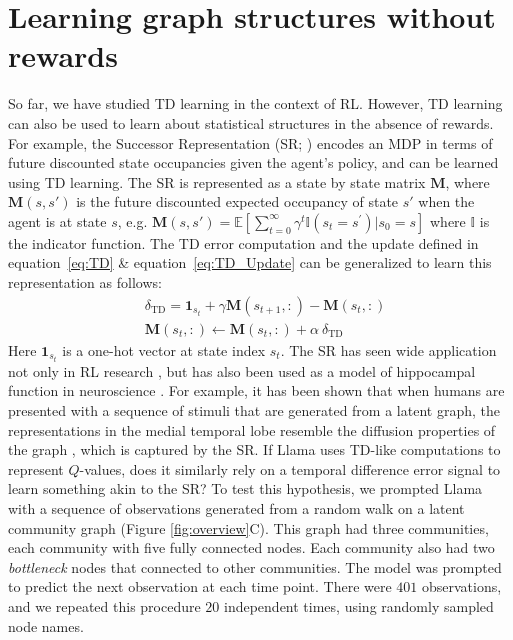 \documentclass{article}
\def\eqref#1{equation~\ref{#1}}
\newcommand{\state}{s_t}
\newcommand{\nextstate}{s_{t+1}}
\begin{document}
\section{Learning graph structures without rewards}
So far, we have studied TD learning in the context of RL. However, TD learning can also be used to learn about statistical structures in the absence of rewards. For example, the Successor Representation (SR; \citealp{dayan_improving_1993}) encodes an MDP in terms of future discounted state occupancies given the agent's policy, and can be learned using TD learning. The SR is represented as a state by state matrix $\mathbf{M}$, where $\mathbf{M}(s, s')$ is the future discounted expected occupancy of state $s'$ when the agent is at state $s$, e.g. $\mathbf{M}(s, s') = \mathbb{E}\left[\mathop{\sum }\limits_{t=0}^{\infty }{\gamma }^{t}{\mathbb{I}}({s}_{t}={s}^{{\prime} })| {s}_{0}=s\right]$ where $\mathbb{I}$ is the indicator function. The TD error computation and the update defined in \eqref{eq:TD} \& \eqref{eq:TD_Update} can be generalized to learn this representation as follows:
\begin{align}
&\delta_{\text{TD}} = \mathbf{1}_{\state} + \gamma \mathbf{M}(\nextstate, :) - \mathbf{M}(\state, :)\label{eq:SR_TD}\\
&\mathbf{M}(\state, :) \leftarrow \mathbf{M}(\state, :) + \alpha \ \delta_{\text{TD}}\label{eq:SR_TD_Update}
\end{align}
Here $\mathbf{1}_{\state}$ is a one-hot vector at state index $\state$. The SR has seen wide application not only in RL research \citep{kulkarni2016deep, barreto2017successor, machado2017eigenoption}, but has also been used as a model of hippocampal function in neuroscience \citep{garvert2023hippocampal,gershman2018successor, stachenfeld2017hippocampus, Gardner2018-fp}. For example, it has been shown that when humans are presented with a sequence of stimuli that are generated from a latent graph, the representations in the medial temporal lobe resemble the diffusion properties of the graph \citep{schapiro_neural_2013, schapiro_statistical_2016, garvert_map_2017}, which is captured by the SR.
If Llama uses TD-like computations to represent $Q$-values, does it similarly rely on a temporal difference error signal to learn something akin to the SR? To test this hypothesis, we prompted Llama with a sequence of observations generated from a random walk on a latent community graph \citep{schapiro_neural_2013} (Figure \ref{fig:overview}C). This graph had three communities, each community with five fully connected nodes. Each community also had two \emph{bottleneck} nodes that connected to other communities. The model was prompted to predict the next observation at each time point. There were $401$ observations, and we repeated this procedure $20$ independent times, using randomly sampled node names.
\end{document}
